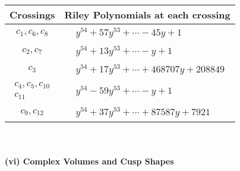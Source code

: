 \documentclass[1p]{elsarticle_modified}
\theoremstyle{definition}
\begin{document}
\begin{tabular}{m{50pt}|m{274pt}}
Crossings & \hspace{64pt}Riley Polynomials at each crossing \\
\hline $$\begin{aligned}c_{1},c_{6},c_{8}\end{aligned}$$&$\begin{aligned}
&y^{54}+57 y^{53}+\cdots-45 y+1
\end{aligned}$\\
\hline $$\begin{aligned}c_{2},c_{7}\end{aligned}$$&$\begin{aligned}
&y^{54}+13 y^{53}+\cdots- y+1
\end{aligned}$\\
\hline $$\begin{aligned}c_{3}\end{aligned}$$&$\begin{aligned}
&y^{54}+17 y^{53}+\cdots+468707 y+208849
\end{aligned}$\\
\hline $$\begin{aligned}c_{4},c_{5},c_{10}\\c_{11}\end{aligned}$$&$\begin{aligned}
&y^{54}-59 y^{53}+\cdots- y+1
\end{aligned}$\\
\hline $$\begin{aligned}c_{9},c_{12}\end{aligned}$$&$\begin{aligned}
&y^{54}+37 y^{53}+\cdots+87587 y+7921
\end{aligned}$\\
\hline
\end{tabular}\\~\\
\newpage\flushleft \textbf{(vi) Complex Volumes and Cusp Shapes}
\end{document}
